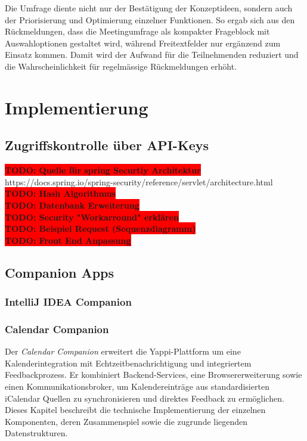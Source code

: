 \documentclass[12pt,a4paper]{report}
\newcommand{\todo}[1]{\colorbox{red}{\textbf{TODO: #1}}\\}
\begin{document}
Die Umfrage diente nicht nur der Bestätigung der Konzeptideen, sondern auch der Priorisierung und Optimierung einzelner Funktionen.
So ergab sich aus den Rückmeldungen, dass die Meetingumfrage als kompakter Frageblock mit Auswahloptionen gestaltet wird,
während Freitextfelder nur ergänzend zum Einsatz kommen.
Damit wird der Aufwand für die Teilnehmenden reduziert und die Wahrscheinlichkeit für regelmässige Rückmeldungen erhöht.

\chapter{Implementierung}
    \section{Zugriffskontrolle über API-Keys}

    \todo{Quelle für spring Securtiy Architektur}
    https://docs.spring.io/spring-security/reference/servlet/architecture.html
    \todo{Hash Algorithmus}
    \todo{Datenbank Erweiterung}
    \todo{Security "Workarround" erklären}
    \todo{Beispiel Request (Sequenzdiagramm)}
    \todo{Front End Anpassung}

\section{Companion Apps}
\subsection{IntelliJ IDEA Companion}


\subsection{Calendar Companion}

    Der \textit{Calendar Companion} erweitert die Yappi-Plattform um eine Kalenderintegration mit Echtzeitbenachrichtigung
    und integriertem Feedbackprozess. Er kombiniert Backend-Services, eine Browsererweiterung sowie einen Kommunikationsbroker,
    um Kalendereinträge aus standardisierten iCalendar Quellen zu synchronisieren und direktes Feedback zu ermöglichen.
    Dieses Kapitel beschreibt die technische Implementierung der einzelnen Komponenten, deren Zusammenspiel
    sowie die zugrunde liegenden Datenstrukturen.
\end{document}
